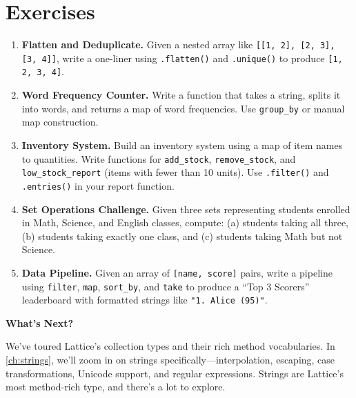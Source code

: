 \section{Exercises}\label{sec:collections-exercises}

\begin{enumerate}
  \item \textbf{Flatten and Deduplicate.} Given a nested array like \lstinline|[[1, 2], [2, 3], [3, 4]]|, write a one-liner using \lstinline|.flatten()| and \lstinline|.unique()| to produce \lstinline|[1, 2, 3, 4]|.

  \item \textbf{Word Frequency Counter.} Write a function that takes a string, splits it into words, and returns a map of word frequencies. Use \lstinline|group_by| or manual map construction.

  \item \textbf{Inventory System.} Build an inventory system using a map of item names to quantities. Write functions for \lstinline|add_stock|, \lstinline|remove_stock|, and \lstinline|low_stock_report| (items with fewer than 10 units). Use \lstinline|.filter()| and \lstinline|.entries()| in your report function.

  \item \textbf{Set Operations Challenge.} Given three sets representing students enrolled in Math, Science, and English classes, compute: (a) students taking all three, (b) students taking exactly one class, and (c) students taking Math but not Science.

  \item \textbf{Data Pipeline.} Given an array of \lstinline|[name, score]| pairs, write a pipeline using \lstinline|filter|, \lstinline|map|, \lstinline|sort_by|, and \lstinline|take| to produce a ``Top 3 Scorers'' leaderboard with formatted strings like \lstinline|"1. Alice (95)"|.
\end{enumerate}

\vspace{1em}
\noindent\textbf{What's Next?}

We've toured Lattice's collection types and their rich method vocabularies. In \cref{ch:strings}, we'll zoom in on strings specifically---interpolation, escaping, case transformations, Unicode support, and regular expressions. Strings are Lattice's most method-rich type, and there's a lot to explore.

